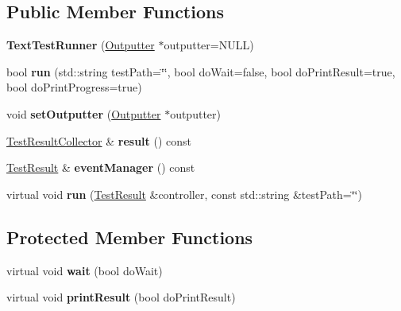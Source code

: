 \subsection*{Public Member Functions}
\begin{DoxyCompactItemize}
\item 
{\bfseries Text\+Test\+Runner} (\hyperlink{class_outputter}{Outputter} $\ast$outputter=N\+U\+LL)\hypertarget{class_text_test_runner_ac7b6cba645a3a5e76382fcd40e4f7eb6}{}\label{class_text_test_runner_ac7b6cba645a3a5e76382fcd40e4f7eb6}

\item 
bool {\bfseries run} (std\+::string test\+Path=\char`\"{}\char`\"{}, bool do\+Wait=false, bool do\+Print\+Result=true, bool do\+Print\+Progress=true)\hypertarget{class_text_test_runner_ad9c38c263202c2bd453b927ba53dcf48}{}\label{class_text_test_runner_ad9c38c263202c2bd453b927ba53dcf48}

\item 
void {\bfseries set\+Outputter} (\hyperlink{class_outputter}{Outputter} $\ast$outputter)\hypertarget{class_text_test_runner_a9d62d11f3acba355e47d21cb99106117}{}\label{class_text_test_runner_a9d62d11f3acba355e47d21cb99106117}

\item 
\hyperlink{class_test_result_collector}{Test\+Result\+Collector} \& {\bfseries result} () const \hypertarget{class_text_test_runner_a7a6cf866d23d621ed35474c8179b9b48}{}\label{class_text_test_runner_a7a6cf866d23d621ed35474c8179b9b48}

\item 
\hyperlink{class_test_result}{Test\+Result} \& {\bfseries event\+Manager} () const \hypertarget{class_text_test_runner_afa50f45ea60892db3cf0b128c06a1629}{}\label{class_text_test_runner_afa50f45ea60892db3cf0b128c06a1629}

\item 
virtual void {\bfseries run} (\hyperlink{class_test_result}{Test\+Result} \&controller, const std\+::string \&test\+Path=\char`\"{}\char`\"{})\hypertarget{class_text_test_runner_a361eaa340138edf3659a9fcb813c3b5d}{}\label{class_text_test_runner_a361eaa340138edf3659a9fcb813c3b5d}

\end{DoxyCompactItemize}
\subsection*{Protected Member Functions}
\begin{DoxyCompactItemize}
\item 
virtual void {\bfseries wait} (bool do\+Wait)\hypertarget{class_text_test_runner_a5b192f9419f5d1e6ebe9abd4755da140}{}\label{class_text_test_runner_a5b192f9419f5d1e6ebe9abd4755da140}

\item 
virtual void {\bfseries print\+Result} (bool do\+Print\+Result)\hypertarget{class_text_test_runner_aa01e5dee4cdad860ee7154329918f9ac}{}\label{class_text_test_runner_aa01e5dee4cdad860ee7154329918f9ac}

\end{DoxyCompactItemize}
